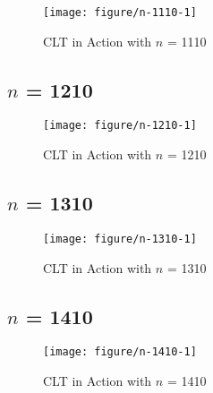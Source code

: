 \documentclass[11pt,letter]{article}\usepackage[]{graphicx}\usepackage[]{color}
\makeatletter
\def\maxwidth{ %
  \ifdim\Gin@nat@width>\linewidth
    \linewidth
  \else
    \Gin@nat@width
  \fi
}
\newenvironment{knitrout}{}{} %
\makeatother
\begin{document}
\begin{knitrout}
\color{fgcolor}\begin{figure}[h]

{\centering \texttt{[image: figure/n-1110-1]} 

}

\caption[CLT in Action with $n$ = 1110]{CLT in Action with $n$ = 1110}\label{fig:n-1110}
\end{figure}


\end{knitrout}
\newpage
\subsection{$n$ = 1210}

\begin{knitrout}
\color{fgcolor}\begin{figure}[h]

{\centering \texttt{[image: figure/n-1210-1]} 

}

\caption[CLT in Action with $n$ = 1210]{CLT in Action with $n$ = 1210}\label{fig:n-1210}
\end{figure}


\end{knitrout}
\newpage
\subsection{$n$ = 1310}

\begin{knitrout}
\color{fgcolor}\begin{figure}[h]

{\centering \texttt{[image: figure/n-1310-1]} 

}

\caption[CLT in Action with $n$ = 1310]{CLT in Action with $n$ = 1310}\label{fig:n-1310}
\end{figure}


\end{knitrout}
\newpage
\subsection{$n$ = 1410}

\begin{knitrout}
\color{fgcolor}\begin{figure}[h]

{\centering \texttt{[image: figure/n-1410-1]} 

}

\caption[CLT in Action with $n$ = 1410]{CLT in Action with $n$ = 1410}\label{fig:n-1410}
\end{figure}


\end{knitrout}
\newpage
\end{document}
